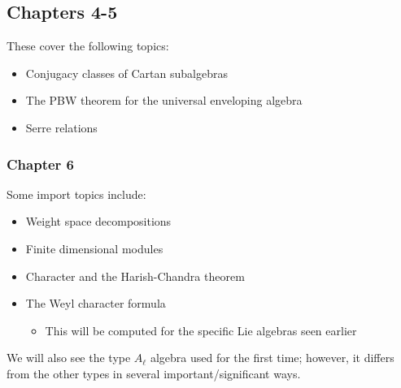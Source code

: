 
\hypertarget{chapters-4-5}{%
\subsection{Chapters 4-5}\label{chapters-4-5}}

These cover the following topics:

\begin{itemize}
\tightlist
\item
  Conjugacy classes of Cartan subalgebras
\item
  The PBW theorem for the universal enveloping algebra
\item
  Serre relations
\end{itemize}

\hypertarget{chapter-6}{%
\subsubsection{Chapter 6}\label{chapter-6}}

Some import topics include:

\begin{itemize}
\tightlist
\item
  Weight space decompositions
\item
  Finite dimensional modules
\item
  Character and the Harish-Chandra theorem
\item
  The Weyl character formula

  \begin{itemize}
  \tightlist
  \item
    This will be computed for the specific Lie algebras seen earlier
  \end{itemize}
\end{itemize}

We will also see the type \(A_{\ell}\) algebra used for the first time;
however, it differs from the other types in several
important/significant ways.

